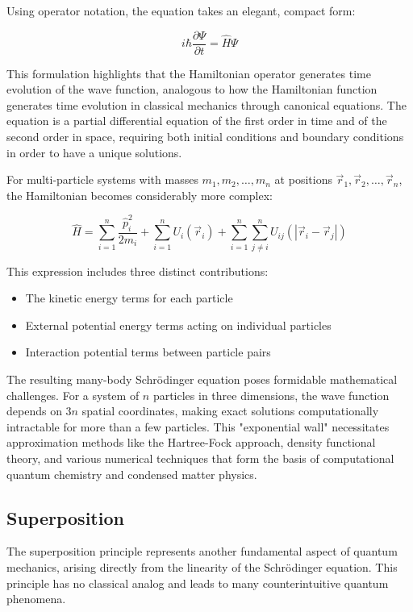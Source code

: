 Using operator notation, the equation takes an elegant, compact form:

\begin{equation}
i \hbar \frac{\partial \Psi}{\partial t}=\hat{H} \Psi
\end{equation}

This formulation highlights that the Hamiltonian operator generates time evolution of the wave function, analogous to how the Hamiltonian function generates time evolution in classical mechanics through canonical equations. The equation is a partial differential equation of the first order in time and of the second order in space, requiring both initial conditions and boundary conditions in order to have a unique solutions.

For multi-particle systems with masses $m_{1}, m_{2}, \ldots, m_{n}$ at positions $\vec{r}_{1}, \vec{r}_{2}, \ldots, \vec{r}_{n}$, the Hamiltonian becomes considerably more complex:

\begin{equation}
\hat{H}=\sum_{i=1}^{n} \frac{\hat{p}_i^{2}}{2 m_{i}}+\sum_{i=1}^{n} U_{i}\left(\vec{r}_{i}\right)+\sum_{i=1}^{n} \sum_{j \neq i}^{n} U_{i j}\left(\left|\vec{r}_{i}-\vec{r}_{j}\right|\right)
\end{equation}

This expression includes three distinct contributions:
\begin{itemize}
\item The kinetic energy terms for each particle
\item External potential energy terms acting on individual particles
\item Interaction potential terms between particle pairs
\end{itemize}
The resulting many-body Schrödinger equation poses formidable mathematical challenges. For a system of $n$ particles in three dimensions, the wave function depends on $3n$ spatial coordinates, making exact solutions computationally intractable for more than a few particles. This "exponential wall" necessitates approximation methods like the Hartree-Fock approach, density functional theory, and various numerical techniques that form the basis of computational quantum chemistry and condensed matter physics.

\subsection{Superposition}
The superposition principle represents another fundamental aspect of quantum mechanics, arising directly from the linearity of the Schrödinger equation. This principle has no classical analog and leads to many counterintuitive quantum phenomena.

